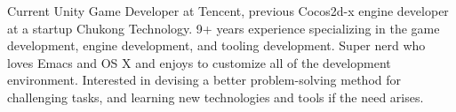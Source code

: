 

\begin{cvparagraph}

Current Unity Game Developer at Tencent, previous Cocos2d-x engine
developer at a startup Chukong Technology. 9+ years experience specializing in
the game development, engine development, and tooling development. Super nerd
who loves Emacs and OS X and enjoys to customize all of the development
environment. Interested in devising a better problem-solving method for
challenging tasks, and learning new technologies and tools if the need arises.
\end{cvparagraph}

